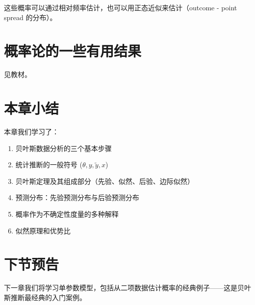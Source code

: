 这些概率可以通过相对频率估计，也可以用正态近似来估计（outcome - point spread 的分布）。

\section{概率论的一些有用结果}

见教材。

\section{本章小结}

本章我们学习了：
\begin{enumerate}
  \item 贝叶斯数据分析的三个基本步骤
  \item 统计推断的一般符号 ($\theta, y, \tilde{y}, x$)
  \item 贝叶斯定理及其组成部分（先验、似然、后验、边际似然）
  \item 预测分布：先验预测分布与后验预测分布
  \item 概率作为不确定性度量的多种解释
  \item 似然原理和优势比
\end{enumerate}

\section{下节预告}

下一章我们将学习单参数模型，包括从二项数据估计概率的经典例子——这是贝叶斯推断最经典的入门案例。

\endinput
